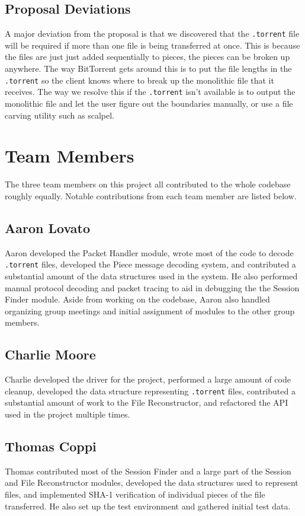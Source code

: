 \documentclass{acm_proc_article-sp}
\begin{document}
\subsection{Proposal Deviations}
A major deviation from the proposal is that we discovered that the
\texttt{.torrent} file will be required if more than one file is being
transferred at once.  This is because the files are just just added
sequentially to pieces, the pieces can be broken up anywhere.  The way
BitTorrent gets around this is to put the file lengths in the \texttt{.torrent}
so the client knows where to break up the monolithic file that it receives.
The way we resolve this if the \texttt{.torrent} isn't available is to output
the monolithic file and let the user figure out the boundaries manually, or use
a file carving utility such as scalpel\cite{scalpel}.

\section{Team Members}
The three team members on this project all contributed to the whole codebase
roughly equally. Notable contributions from each team member are listed below.

\subsection{Aaron Lovato}
Aaron developed the Packet Handler module, wrote most of the code to decode
\texttt{.torrent} files, developed the Piece message decoding system, and
contributed a substantial amount of the data structures used in the system. He
also performed manual protocol decoding and packet tracing to aid in debugging
the the Session Finder module. Aside from working on the codebase, Aaron also
handled organizing group meetings and initial assignment of modules to the other
group members.

\subsection{Charlie Moore}
Charlie developed the driver for the project, performed a large amount of code
cleanup, developed the data structure representing \texttt{.torrent} files,
contributed a substantial amount of work to the File Reconstructor, and
refactored the API used in the project multiple times.

\subsection{Thomas Coppi}
Thomas contributed most of the Session Finder and a large part of the Session
and File Reconstructor modules, developed the data structures used to represent
files, and implemented SHA-1 verification of individual pieces of the file
transferred.  He also set up the test environment and gathered initial test
data.
\end{document}

